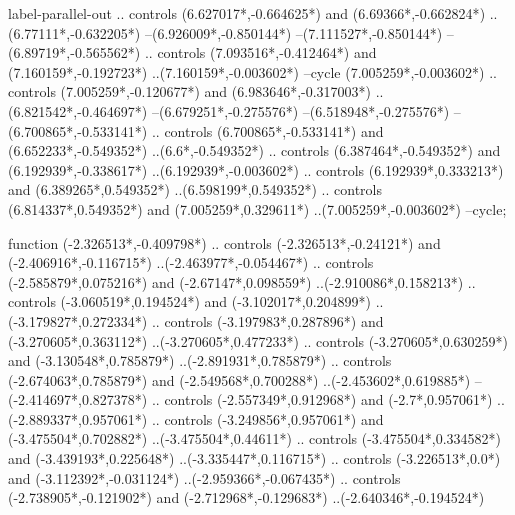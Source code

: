 {\begin{scope}[x=1mm,y=1mm,line width=\SCstroke mm,line cap=round,line join=round]
\begin{SCpart}{label-parallel-out}
.. controls ({6.627017*\SCF},{-0.664625*\SCF}) and ({6.69366*\SCF},{-0.662824*\SCF}) ..({6.77111*\SCF},{-0.632205*\SCF})
--({6.926009*\SCF},{-0.850144*\SCF})
--({7.111527*\SCF},{-0.850144*\SCF})
--({6.89719*\SCF},{-0.565562*\SCF})
.. controls ({7.093516*\SCF},{-0.412464*\SCF}) and ({7.160159*\SCF},{-0.192723*\SCF}) ..({7.160159*\SCF},{-0.003602*\SCF})
--cycle
({7.005259*\SCF},{-0.003602*\SCF})
.. controls ({7.005259*\SCF},{-0.120677*\SCF}) and ({6.983646*\SCF},{-0.317003*\SCF}) ..({6.821542*\SCF},{-0.464697*\SCF})
--({6.679251*\SCF},{-0.275576*\SCF})
--({6.518948*\SCF},{-0.275576*\SCF})
--({6.700865*\SCF},{-0.533141*\SCF})
.. controls ({6.700865*\SCF},{-0.533141*\SCF}) and ({6.652233*\SCF},{-0.549352*\SCF}) ..({6.6*\SCF},{-0.549352*\SCF})
.. controls ({6.387464*\SCF},{-0.549352*\SCF}) and ({6.192939*\SCF},{-0.338617*\SCF}) ..({6.192939*\SCF},{-0.003602*\SCF})
.. controls ({6.192939*\SCF},{0.333213*\SCF}) and ({6.389265*\SCF},{0.549352*\SCF}) ..({6.598199*\SCF},{0.549352*\SCF})
.. controls ({6.814337*\SCF},{0.549352*\SCF}) and ({7.005259*\SCF},{0.329611*\SCF}) ..({7.005259*\SCF},{-0.003602*\SCF})
--cycle;
\end{SCpart}
\begin{SCpart}{function}
 ({-2.326513*\SCF},{-0.409798*\SCF})
.. controls ({-2.326513*\SCF},{-0.24121*\SCF}) and ({-2.406916*\SCF},{-0.116715*\SCF}) ..({-2.463977*\SCF},{-0.054467*\SCF})
.. controls ({-2.585879*\SCF},{0.075216*\SCF}) and ({-2.67147*\SCF},{0.098559*\SCF}) ..({-2.910086*\SCF},{0.158213*\SCF})
.. controls ({-3.060519*\SCF},{0.194524*\SCF}) and ({-3.102017*\SCF},{0.204899*\SCF}) ..({-3.179827*\SCF},{0.272334*\SCF})
.. controls ({-3.197983*\SCF},{0.287896*\SCF}) and ({-3.270605*\SCF},{0.363112*\SCF}) ..({-3.270605*\SCF},{0.477233*\SCF})
.. controls ({-3.270605*\SCF},{0.630259*\SCF}) and ({-3.130548*\SCF},{0.785879*\SCF}) ..({-2.891931*\SCF},{0.785879*\SCF})
.. controls ({-2.674063*\SCF},{0.785879*\SCF}) and ({-2.549568*\SCF},{0.700288*\SCF}) ..({-2.453602*\SCF},{0.619885*\SCF})
--({-2.414697*\SCF},{0.827378*\SCF})
.. controls ({-2.557349*\SCF},{0.912968*\SCF}) and ({-2.7*\SCF},{0.957061*\SCF}) ..({-2.889337*\SCF},{0.957061*\SCF})
.. controls ({-3.249856*\SCF},{0.957061*\SCF}) and ({-3.475504*\SCF},{0.702882*\SCF}) ..({-3.475504*\SCF},{0.44611*\SCF})
.. controls ({-3.475504*\SCF},{0.334582*\SCF}) and ({-3.439193*\SCF},{0.225648*\SCF}) ..({-3.335447*\SCF},{0.116715*\SCF})
.. controls ({-3.226513*\SCF},{0.0*\SCF}) and ({-3.112392*\SCF},{-0.031124*\SCF}) ..({-2.959366*\SCF},{-0.067435*\SCF})
.. controls ({-2.738905*\SCF},{-0.121902*\SCF}) and ({-2.712968*\SCF},{-0.129683*\SCF}) ..({-2.640346*\SCF},{-0.194524*\SCF})

\end{SCpart}
\end{scope}}
